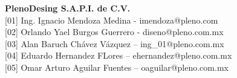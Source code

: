 \def\vhhistoryname{Revisión}%
\def\vhversionname{Versión}%
\def\vhdatename{Fecha}%
\def\vhauthorname{Autor}%
\def\vhchangename{Descripción}%

\begin{versionhistory}
\end{versionhistory}

\vfill 

\noindent\large\textbf{PlenoDesing S.A.P.I. de C.V.}\\

\noindent\normalsize [01] Ing. Ignacio Mendoza Medina - imendoza@pleno.com\\
\noindent\normalsize [02] Orlando Yael Burgos Guerrero - diseno@pleno.com.mx\\
\noindent\normalsize [03] Alan Baruch Chávez Vázquez – ing\_01@pleno.com.mx\\
\noindent\normalsize [04] Eduardo Hernandez FLores – ehernandez@pleno.com.mx\\
\noindent\normalsize [05] Omar Arturo Aguilar Fuentes – oaguilar@pleno.com.mx\\



